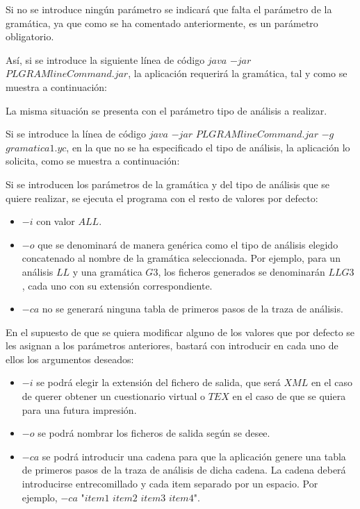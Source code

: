  
Si no se introduce ningún parámetro se indicará que falta el parámetro de la gramática, ya que como se ha comentado anteriormente, es un parámetro obligatorio.
 
Así, si se introduce la siguiente línea de código  $java$ $-jar$ $PLGRAMlineCommand.jar $, la aplicación requerirá la gramática, tal y como se muestra a continuación:

 
La misma situación se presenta con el parámetro tipo de análisis a realizar.
 
Si se  introduce la línea de código $java$ $-jar$ $PLGRAMlineCommand.jar$  $-g$ $gramatica1.yc $, en la que no se ha especificado el tipo de análisis, la aplicación lo solicita, como se muestra a continuación:

Si se introducen los parámetros de la gramática y del tipo de análisis que se quiere realizar, se ejecuta el programa con el resto de valores por defecto:
\begin{itemize}
\item $-i$ con valor $ALL$.
\item $-o$ que se denominará de manera genérica como el tipo de análisis elegido concatenado al nombre de la gramática seleccionada. Por ejemplo, para un análisis $LL$ y una gramática $G3$, los ficheros generados se denominarán $LLG3$, cada uno con su extensión correspondiente.
\item $-ca$ no se generará ninguna tabla de primeros pasos de la traza de análisis.
\end{itemize}


En el supuesto de que se quiera modificar alguno de los valores que por defecto se les asignan a los parámetros anteriores, bastará con introducir en cada uno de ellos los argumentos deseados:
\begin{itemize}
\item $-i$ se podrá elegir la extensión del fichero de salida, que será $XML$ en el caso de querer obtener un cuestionario virtual o  $TEX$ en el caso de que se quiera para una futura impresión.
\item $-o$ se podrá nombrar los ficheros de salida según se desee.
\item $-ca$ se podrá introducir una cadena para  que la aplicación genere una tabla de primeros pasos de la traza de análisis de dicha cadena.
La cadena deberá introducirse entrecomillado y cada item separado por un espacio. Por ejemplo, $-ca$ "$item1$ $item2$ $item3$ $item4$".
\end{itemize}


